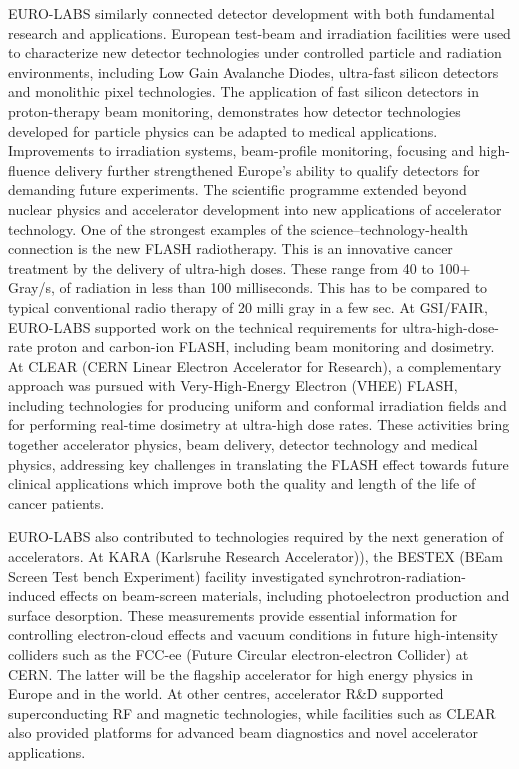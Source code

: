 EURO-LABS similarly connected detector development with both fundamental research and applications. European test-beam and irradiation facilities were used to characterize new detector technologies under controlled particle and radiation environments, including Low Gain Avalanche Diodes, ultra-fast silicon detectors and monolithic pixel technologies. The application of fast silicon detectors in proton-therapy beam monitoring, demonstrates how detector technologies developed for particle physics can be adapted to medical applications. Improvements to irradiation systems, beam-profile monitoring, focusing and high-fluence delivery further strengthened Europe’s ability to qualify detectors for demanding future experiments. The scientific programme extended beyond nuclear physics and accelerator development into new applications of accelerator technology. One of the strongest examples of the science–technology-health connection is the new FLASH radiotherapy. This is an innovative cancer treatment by the delivery of ultra-high doses. These range from 40 to 100+ Gray/s, of radiation in less than 100 milliseconds. This has to be compared to typical conventional radio therapy of 20 milli gray in a few sec. At GSI/FAIR, EURO-LABS supported work on the technical requirements for ultra-high-dose-rate proton and carbon-ion FLASH, including beam monitoring and dosimetry. At CLEAR (CERN Linear Electron Accelerator for Research), a complementary approach was pursued with Very-High-Energy Electron (VHEE) FLASH, including technologies for producing uniform and conformal irradiation fields and for performing real-time dosimetry at ultra-high dose rates. These activities bring together accelerator physics, beam delivery, detector technology and medical physics, addressing key challenges in translating the FLASH effect towards future clinical applications which improve both the quality and length of the life of cancer patients. 

EURO-LABS also contributed to technologies required by the next generation of accelerators. At KARA (Karlsruhe Research Accelerator)), the BESTEX (BEam Screen Test bench Experiment) facility investigated synchrotron-radiation-induced effects on beam-screen materials, including photoelectron production and surface desorption. These measurements provide essential information for controlling electron-cloud effects and vacuum conditions in future high-intensity colliders such as the FCC-ee (Future  Circular electron-electron Collider) at CERN. The latter will be the flagship accelerator for high energy physics  in Europe and in the world. At other centres, accelerator R\&D supported superconducting RF and magnetic technologies, while facilities such as CLEAR also provided platforms for advanced beam diagnostics and novel accelerator applications.

